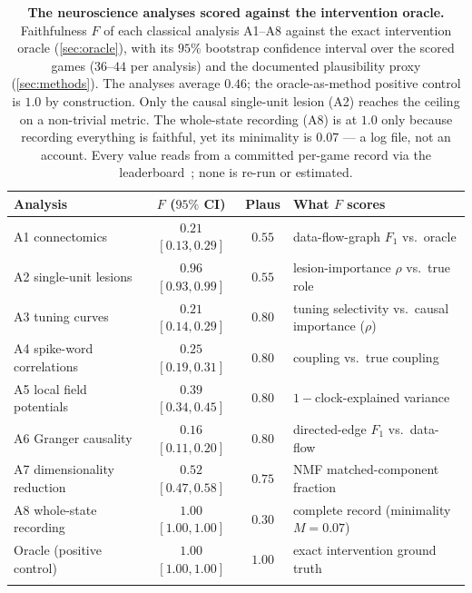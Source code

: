 \begin{table}[t]
\footnotesize
\setlength{\tabcolsep}{4pt}
\caption{\textbf{The neuroscience analyses scored against the intervention oracle.}
Faithfulness $F$ of each classical analysis A1--A8 against the exact intervention oracle
(\Sectionname\ref{sec:oracle}), with its $95\%$ bootstrap confidence interval over the scored
games ($36$--$44$ per analysis) and the documented plausibility proxy (\Sectionname\ref{sec:methods}). The analyses
average $0.46$; the oracle-as-method positive control is $1.0$ by construction. Only the
causal single-unit lesion (A2) reaches the ceiling on a non-trivial metric. The whole-state
recording (A8) is at $1.0$ only because recording everything is faithful, yet its minimality
is $0.07$ --- a log file, not an account. Every value reads from a committed per-game record
via the leaderboard~\cite{leaderboardP2}; none is re-run or estimated.}
\label{tab:phaseA}
\begin{tabularx}{\textwidth}{@{}l c c >{\raggedright\arraybackslash}X@{}}
\toprule
Analysis & $F$ ($95\%$ CI) & Plaus & What $F$ scores \\
\midrule
A1 connectomics             & $0.21$ $[0.13,0.29]$ & $0.55$ & data-flow-graph $F_1$ vs.\ oracle \\
A2 single-unit lesions      & $0.96$ $[0.93,0.99]$ & $0.55$ & lesion-importance $\rho$ vs.\ true role \\
A3 tuning curves            & $0.21$ $[0.14,0.29]$ & $0.80$ & tuning selectivity vs.\ causal importance ($\rho$) \\
A4 spike-word correlations  & $0.25$ $[0.19,0.31]$ & $0.80$ & coupling vs.\ true coupling \\
A5 local field potentials   & $0.39$ $[0.34,0.45]$ & $0.80$ & $1-$clock-explained variance \\
A6 Granger causality        & $0.16$ $[0.11,0.20]$ & $0.80$ & directed-edge $F_1$ vs.\ data-flow \\
A7 dimensionality reduction & $0.52$ $[0.47,0.58]$ & $0.75$ & NMF matched-component fraction \\
A8 whole-state recording    & $1.00$ $[1.00,1.00]$ & $0.30$ & complete record (minimality $M=0.07$) \\
\midrule
Oracle (positive control)   & $1.00$ $[1.00,1.00]$ & $1.00$ & exact intervention ground truth \\
\botrule
\end{tabularx}
\end{table}

